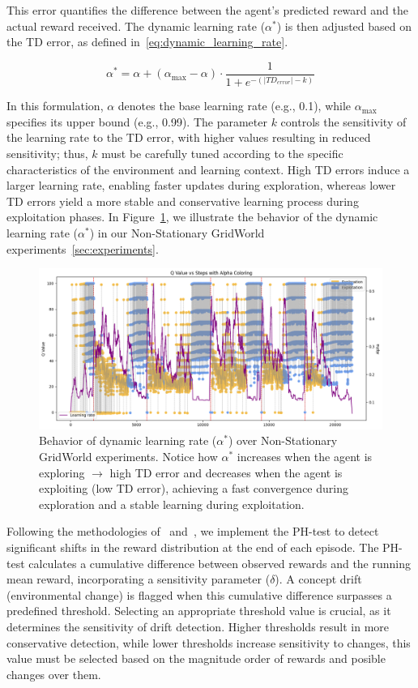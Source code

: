 This error quantifies the difference between the agent’s predicted reward and the actual reward received. The dynamic learning rate ($\alpha^*$) is then adjusted based on the TD error, as defined in~\eqref{eq:dynamic_learning_rate}.

\begin{equation}
    \label{eq:dynamic_learning_rate}
    \alpha^* = \alpha + (\alpha_{\max}-\alpha) \cdot \frac{1}{1 + e^{-(|TD_{error}|-k)}}
\end{equation}

In this formulation, $\alpha$ denotes the base learning rate (e.g., 0.1), while $\alpha_{\max}$ specifies its upper bound (e.g., 0.99). The parameter $k$ controls the sensitivity of the learning rate to the TD error, with higher values resulting in reduced sensitivity; thus, $k$ must be carefully tuned according to the specific characteristics of the environment and learning context. High TD errors induce a larger learning rate, enabling faster updates during exploration, whereas lower TD errors yield a more stable and conservative learning process during exploitation phases. In Figure~\ref{fig:alpha}, we illustrate the behavior of the dynamic learning rate ($\alpha^*$) in our Non-Stationary GridWorld experiments~\ref{sec:experiments}.

\begin{figure}
    \centering
    \includegraphics[width=\textwidth]{figures/alpha.png}
    \caption{Behavior of dynamic learning rate ($\alpha^*$) over Non-Stationary GridWorld experiments. Notice how $\alpha^*$ increases when the agent is exploring $\rightarrow$ high TD error and decreases when the agent is exploiting (low TD error), achieving a fast convergence during exploration and a stable learning during exploitation.}
    \label{fig:alpha}
\end{figure}

Following the methodologies of~\citet{mignon2017adaptive} and~\citet{networkdynamicrl}, we implement the PH-test to detect significant shifts in the reward distribution at the end of each episode. The PH-test calculates a cumulative difference between observed rewards and the running mean reward, incorporating a sensitivity parameter ($\delta$). A concept drift (environmental change) is flagged when this cumulative difference surpasses a predefined threshold. Selecting an appropriate threshold value is crucial, as it determines the sensitivity of drift detection. Higher thresholds result in more conservative detection, while lower thresholds increase sensitivity to changes, this value must be selected based on the magnitude order of rewards and posible changes over them.

